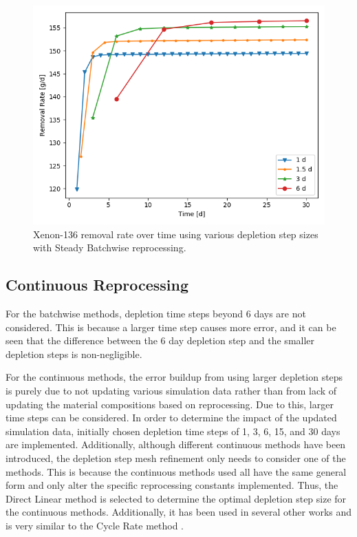 \begin{figure}[H]
  \centering
  \includegraphics[scale=0.7]{images/waste_Xe136_6d_sp_comp.png}
  \caption{Xenon-136 removal rate over time using various depletion step sizes with Steady Batchwise reprocessing.}
   \label{fig:steady-batch-xe136-repr}
\end{figure}

\subsection{Continuous Reprocessing}
\label{s:cont-meshing}

For the batchwise methods, depletion time steps beyond 6 days are not considered. This is because a larger time step causes more error, and it can be seen that the difference between the 6 day depletion step and the smaller depletion steps is non-negligible.

For the continuous methods, the error buildup from using larger depletion steps is purely due to not updating various simulation data rather than from lack of updating the material compositions based on reprocessing. Due to this, larger time steps can be considered. In order to determine the impact of the updated simulation data, initially chosen depletion time steps of 1, 3, 6, 15, and 30 days are implemented. Additionally, although different continuous methods have been introduced, the depletion step mesh refinement only needs to consider one of the methods. This is because the continuous methods used all have the same general form and only alter the specific reprocessing constants implemented. Thus, the Direct Linear method is selected to determine the optimal depletion step size for the continuous methods. Additionally, it has been used in several other works and is very similar to the Cycle Rate method \cite{xia_development_2019, nuttin_potential_2005, zhou_fuel_2018}.

